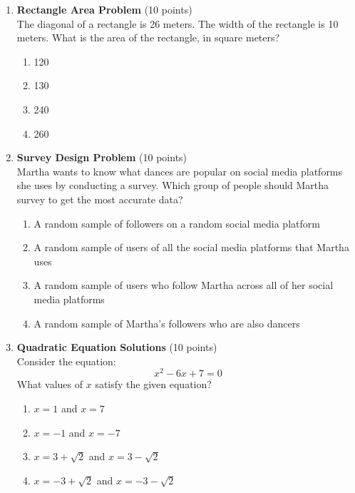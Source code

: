 \begin{enumerate}
  \newpage

  \item \textbf{Rectangle Area Problem} (10 points)\\
  The diagonal of a rectangle is 26 meters. The width of the rectangle is 10 meters. What is the area of the rectangle, in square meters?
  \begin{enumerate}[label=(\Alph*)]
    \item 120
    \item 130
    \item 240
    \item 260
  \end{enumerate}
  \begin{subanswer}
  \end{subanswer}

  \item \textbf{Survey Design Problem} (10 points)\\
  Martha wants to know what dances are popular on social media platforms she uses by conducting a survey. Which group of people should Martha survey to get the most accurate data?
  \begin{enumerate}[label=(\Alph*)]
    \item A random sample of followers on a random social media platform
    \item A random sample of users of all the social media platforms that Martha uses
    \item A random sample of users who follow Martha across all of her social media platforms
    \item A random sample of Martha's followers who are also dancers
  \end{enumerate}
  \begin{subanswer}
  \end{subanswer}



  \newpage

  \item \textbf{Quadratic Equation Solutions} (10 points)\\
  Consider the equation:
  \[
    x^2-6 x+7=0
  \]
  What values of $x$ satisfy the given equation?
  \begin{enumerate}[label=(\Alph*)]
    \item $x=1$ and $x=7$
    \item $x=-1$ and $x=-7$
    \item $x=3+\sqrt{2}$ and $x=3-\sqrt{2}$
    \item $x=-3+\sqrt{2}$ and $x=-3-\sqrt{2}$
  \end{enumerate}
  \begin{subanswer}
  \end{subanswer}


\end{enumerate}
